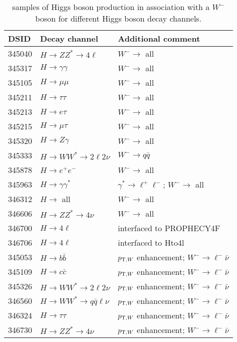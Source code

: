 \begin{table}[!htbp]
  \caption{\POWPY[8] samples of Higgs boson production in association with a $W^{-}$ boson for different Higgs boson decay channels.}
  \label{tab:higgs-WmH-samples}
  \centering
  \begin{tabular}{l l l}
    \toprule
    DSID   & Decay channel & Additional comment \\
    \midrule
    345040 & $H \to ZZ^{*} \to 4\ell$ & $W^{-}\to$ all\\
    345317 & $H \to \gamma\gamma$ & $W^{-}\to$ all\\
    345105 & $H \to \mu\mu$ &  $W^{-}\to$ all\\
    345211 & $H \to \tau\tau$ &  $W^{-}\to$ all\\
    345213 & $H \to e \tau $ & $W^{-}\to$ all\\
    345215 & $H \to \mu \tau $ & $W^{-}\to$ all\\
    345320 & $H \to Z\gamma$ & $W^{-}\to$ all\\
    345333 & $H \to WW^{*} \to 2\ell2\nu $ & $W^{-} \to q\bar{q}$ \\
    345878 & $H \to e^{+}e^{-}$ & $W^{-}\to$ all\\
    345963 & $H \to \gamma\gamma^{*}$ & $\gamma^{*}\to \ell^{+}\ell^{-}$; $W^{-}\to$ all\\
    346312 & $H \to$ all & $W^{-}\to$ all\\ 
    346606 & $H \to ZZ^{*} \to 4\nu $ & $W^{-}\to$ all\\
    346700 & $H \to 4\ell$ & interfaced to PROPHECY4F \\
    346706 & $H \to 4\ell$ & interfaced to Hto4l \\
    345053 & $H \to b\bar{b}$ & $p_{{\textrm T},W}$ enhancement; $W^{-}\to \ell^{-}\bar{\nu}$ \\
    345109 & $H \to c\bar{c}$ & $p_{{\textrm T},W}$ enhancement; $W^{-}\to \ell^{-}\bar{\nu}$  \\
    345326 & $H \to WW^{*} \to 2\ell2\nu$ & $p_{{\textrm T},W}$ enhancement;  $W^{-}\to \ell^{-}\bar{\nu}$ \\
    346560 & $H \to WW^{*} \to q\bar{q}\ell\nu$ & $p_{{\textrm T},W}$ enhancement; $W^{-}\to \ell^{-}\bar{\nu}$ \\
    346324 & $H \to \tau\tau$ & $p_{{\textrm T},W}$ enhancement; $W^{-}\to \ell^{-}\bar{\nu}$ \\
    346730 & $H \to ZZ^{*} \to 4\nu$ & $p_{{\textrm T},W}$ enhancement; $W^{-}\to \ell^{-}\bar{\nu}$ \\
    \bottomrule
  \end{tabular}
\end{table}

